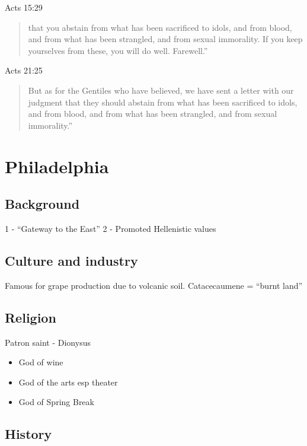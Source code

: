 \documentclass[
]{book}
\providecommand{\tightlist}{%
  \setlength{\itemsep}{0pt}\setlength{\parskip}{0pt}}
\begin{document}
Acts 15:29

\begin{quote}
that you abstain from what has been sacrificed to idols, and from blood, and from what has been strangled, and from sexual immorality. If you keep yourselves from these, you will do well. Farewell.''
\end{quote}

Acts 21:25

\begin{quote}
But as for the Gentiles who have believed, we have sent a letter with our judgment that they should abstain from what has been sacrificed to idols, and from blood, and from what has been strangled, and from sexual immorality.''
\end{quote}

\hypertarget{philadelphia}{%
\chapter{Philadelphia}\label{philadelphia}}

\hypertarget{background}{%
\section{Background}\label{background}}

1 - ``Gateway to the East''
2 - Promoted Hellenistic values

\hypertarget{culture-and-industry}{%
\section{Culture and industry}\label{culture-and-industry}}

Famous for grape production due to volcanic soil. Catacecaumene = ``burnt land''

\hypertarget{religion}{%
\section{Religion}\label{religion}}

Patron saint - Dionysus

\begin{itemize}
\tightlist
\item
  God of wine
\item
  God of the arts esp theater
\item
  God of Spring Break
\end{itemize}

\hypertarget{history-3}{%
\section{History}\label{history-3}}
\end{document}
